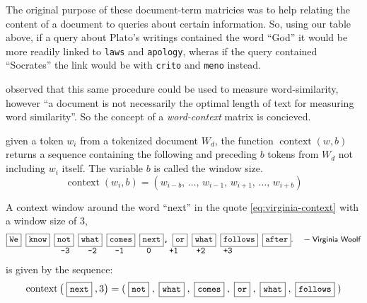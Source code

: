 The original purpose of these document-term matricies was to help relating the content of a document to queries about certain information. So, using our table above, if a query about Plato's writings contained the word ``God'' it would be more readily linked to \texttt{laws} and \texttt{apology}, wheras if the query contained ``Socrates'' the link would be with \texttt{crito} and \texttt{meno} instead.

\textcite{deerwester-1990-indexing-by-lsa} observed that this same procedure could be used to measure word-similarity, however ``a document is not necessarily the optimal length of text for measuring word similarity''. So the concept of a \emph{word-context} matrix is concieved.

\begin{definition}
  given a token $w_i$ from a tokenized document $W_d$, the function $\operatorname{context}(w, b)$ returns a sequence containing the following and preceding $b$ tokens from $W_d$ not including $w_i$ itself. The variable $b$ is called the window size.
  \begin{equation}
    \operatorname{context}(w_i,b)=(w_{i-b},\,\dots,\,w_{i-1},\,w_{i+1},\,\dots,\,w_{i+b})
  \end{equation}
\end{definition}

\begin{example}
  A context window around the word ``next'' in the quote \eqref{eq:virginia-context} with a window size of 3,
  \begin{align}
    &\texttt{\fbox{We\vphantom{hy}} \fbox{know\vphantom{hy}} \fbox{not\vphantom{hy}} \fbox{what\vphantom{hy}} \fbox{comes\vphantom{hy}} \fbox{next\vphantom{hy}}, \fbox{or\vphantom{hy}} \fbox{what\vphantom{hy}} \fbox{follows\vphantom{hy}} \fbox{after\vphantom{hy}}}. \quad-\text{{\sffamily\small Virginia Woolf}}\nonumber\\[-.5em]
    &\texttt{~~~~~~~~~~~~-3~~~~-2~~~~-1~~~~~0~~~~+1~~~~+2~~~~+3}\label{eq:virginia-context}
  \end{align}
  is given by the sequence:\vspace{-0.5em}
  \begin{equation*}
    \operatorname{context}\big(\;\fbox{\small{\texttt{next}\vphantom{hy}}}\;, 3\big)= (\;\fbox{\small{\texttt{not}\vphantom{hy}}}\;, \;\fbox{\small{\texttt{what}\vphantom{hy}}}\;, \;\fbox{\small{\texttt{comes}\vphantom{hy}}}\;, \;\fbox{\small{\texttt{or}\vphantom{hy}}}\;, \;\fbox{\small{\texttt{what}\vphantom{hy}}}\;, \;\fbox{\small{\texttt{follows}\vphantom{hy}}}\;)
  \end{equation*}
  \vspace{0.5em}
\end{example}

